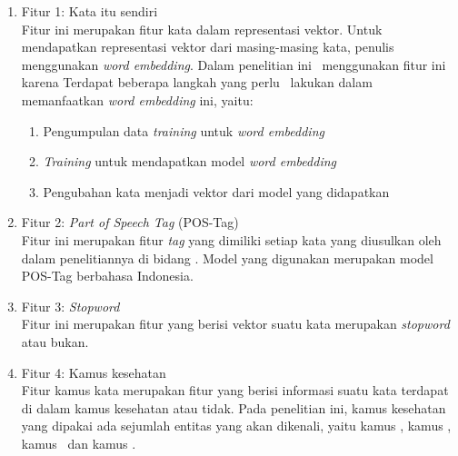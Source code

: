 	\begin{enumerate}
		\item Fitur 1: Kata itu sendiri\\
		Fitur ini merupakan fitur kata dalam representasi vektor. Untuk mendapatkan representasi vektor dari masing-masing kata, penulis menggunakan \textit{word embedding}. Dalam penelitian ini \saya~menggunakan fitur ini karena Terdapat beberapa langkah yang perlu \saya~lakukan dalam memanfaatkan \textit{word embedding} ini, yaitu:
		\begin{enumerate}
			\item Pengumpulan data \textit{training} untuk \textit{word embedding}
			\item \textit{Training} untuk mendapatkan model \textit{word embedding}
			\item Pengubahan kata menjadi vektor dari model yang didapatkan
		\end{enumerate}
		
		\item Fitur 2: \textit{Part of Speech Tag} (POS-Tag)\\
		Fitur ini merupakan fitur \textit{tag} yang dimiliki setiap kata yang diusulkan oleh \cite{abacha2011medical} dalam penelitiannya di bidang \mer. Model yang digunakan merupakan model POS-Tag berbahasa Indonesia.
		
		\item Fitur 3: \textit{Stopword}\\
		Fitur ini merupakan fitur yang berisi vektor suatu kata merupakan \textit{stopword} atau bukan.
		
		\item Fitur 4: Kamus kesehatan\\
		Fitur kamus kata merupakan fitur yang berisi informasi suatu kata terdapat di dalam kamus kesehatan atau tidak. Pada penelitian ini, kamus kesehatan yang dipakai ada sejumlah entitas yang akan dikenali, yaitu kamus \disease, kamus \symptom, kamus \drug~dan kamus \treatment.\
		

\end{enumerate}
